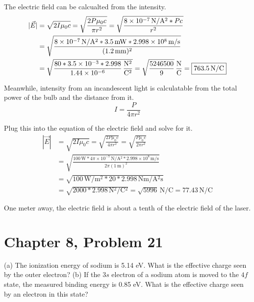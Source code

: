 \documentclass[12pt]{article}
\newcommand{\E}[1]{\times 10^{#1}}
\begin{document}
            The electric field can be calcualted from the intensity.
            \begin{align}
                |\vec{E}|   &=  \sqrt{2I\mu_0 c}
                    =   \sqrt{\frac{2P\mu_0 c}{\pi r^2}}
                    =   \sqrt{\frac{8\E{-7}\,\unit{\newton/\ampere^2} * P c}{r^2}}\\
                    &=  \sqrt{\frac{8\E{-7}\,\unit{\newton/\ampere^2} * 3.5\,\unit{\milli\watt} * 2.998\E{8}\,\unit{\meter/\second}}{(1.2\,\unit{\milli\meter})^2}}\\
                    &=  \sqrt{\frac{80 * 3.5\E{-3} * 2.998}{1.44\E{-6}}\,\unit{\frac{\newton^2}{\coulomb^2}}}
                    =   \sqrt{\frac{5246500}{9}}\,\unit{\frac{\newton}{\coulomb}}
                    =   \boxed{763.5\,\unit{\newton/\coulomb}}
            \end{align}

            Meanwhile, intensity from an incandescent light is calculatable from the total power of the bulb and the distance from it.
            \begin{equation}
                I = \frac{P}{4\pi r^2}
            \end{equation}

            Plug this into the equation of the electric field and solve for it.
            \begin{align}
                |\vec{E}|   &=  \sqrt{2I\mu_0 c}
                    =   \sqrt{\frac{2 P \mu_0 c}{4\pi r^2}}
                    =   \sqrt{\frac{P \mu_0 c}{2 \pi r^2}}\\
                    &=  \sqrt{\frac{100\,\unit{\watt} * 4\pi\E{-7}\,\unit{\newton/\ampere^2} * 2.998\E{8}\,\unit{\meter/\second}}{2 \pi (1\,\unit{\meter})^2}}\\
                    &=  \sqrt{100\,\unit{\watt/\meter^2} * 20 * 2.998\,\unit{\newton\meter/\ampere^2\second}}\\
                    &=  \sqrt{2000 * 2.998\,\unit{\newton^2/\coulomb^2}}
                    =   \sqrt{5996}\,\unit{\newton/\coulomb}
                    =   77.43\,\unit{\newton/\coulomb}
            \end{align}

            One meter away, the electric field is about a tenth of the electric field of the laser.
    \pagebreak
    
    \section{Chapter 8, Problem 21}
        (a) The ionization energy of sodium is 5.14 eV. 
        What is the effective charge seen by the outer electron? 
        (b) If the $3s$ electron of a sodium atom is moved to the $4f$ state, the measured binding energy is 0.85 eV. 
        What is the effective charge seen by an electron in this state?
\end{document}
